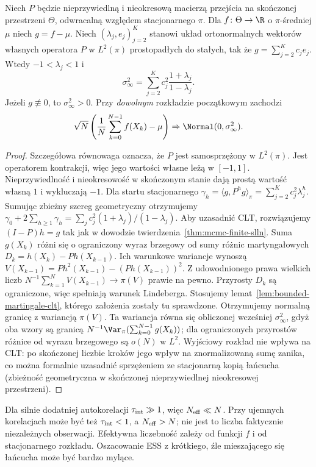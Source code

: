 \begin{twierdzenie}
\label{thm:mcmc-reversible-clt}
Niech $P$ będzie nieprzywiedlną i nieokresową
macierzą przejścia na skończonej przestrzeni $\Theta$,
odwracalną względem stacjonarnego $\pi$.
Dla $f\colon\Theta\to\R$ o $\pi$-średniej $\mu$ niech
$g=f-\mu$. Niech $(\lambda_j,e_j)_{j=2}^K$
stanowi układ ortonormalnych wektorów własnych
operatora $P$ w $L^2(\pi)$ prostopadłych do stałych,
tak że $g=\sum_{j=2}^Kc_je_j$.
Wtedy $-1<\lambda_j<1$ i
\[
 \sigma_\infty^2
 =\sum_{j=2}^K c_j^2\frac{1+\lambda_j}{1-\lambda_j}.
\]
Jeżeli $g\not\equiv0$, to $\sigma_\infty^2>0$.
Przy \emph{dowolnym} rozkładzie początkowym zachodzi
\[
 \sqrt N\left(\frac1N\sum_{k=0}^{N-1}f(X_k)-\mu\right)
 \Rightarrow\Normal(0,\sigma_\infty^2).
\]
\end{twierdzenie}
\begin{proof}
Szczegółowa równowaga oznacza, że $P$ jest samosprzężony
w $L^2(\pi)$. Jest operatorem kontrakcji, więc jego
wartości własne leżą w $[-1,1]$. Nieprzywiedlność i
nieokresowość w skończonym stanie dają prostą wartość
własną $1$ i wykluczają $-1$.
Dla startu stacjonarnego
$\gamma_h=\langle g,P^hg\rangle_\pi=
\sum_{j=2}^Kc_j^2\lambda_j^h$.
Sumując zbieżny szereg geometryczny otrzymujemy
$\gamma_0+2\sum_{h\ge1}\gamma_h
=\sum_jc_j^2(1+\lambda_j)/(1-\lambda_j)$.
Aby uzasadnić CLT, rozwiązujemy $(I-P)h=g$ tak jak
w dowodzie twierdzenia~\ref{thm:mcmc-finite-slln}.
Suma $g(X_k)$ różni się o ograniczony wyraz brzegowy
od sumy różnic martyngałowych
$D_k=h(X_k)-Ph(X_{k-1})$. Ich warunkowe wariancje
wynoszą $V(X_{k-1})=Ph^2(X_{k-1})-(Ph(X_{k-1}))^2$.
Z udowodnionego prawa wielkich liczb
$N^{-1}\sum_{k=1}^NV(X_{k-1})\to\pi(V)$
prawie na pewno. Przyrosty $D_k$ są ograniczone,
więc spełniają warunek Lindeberga. Stosujemy lemat~\ref{lem:bounded-martingale-clt},
którego założenia zostały tu sprawdzone.
Otrzymujemy normalną granicę z wariancją $\pi(V)$. Ta wariancja
równa się obliczonej wcześniej $\sigma_\infty^2$,
gdyż oba wzory są granicą $N^{-1}\Var_\pi(
\sum_{k=0}^{N-1}g(X_k))$; dla ograniczonych przyrostów
różnice od wyrazu brzegowego są $o(N)$ w $L^2$.
Wyjściowy rozkład nie wpływa na CLT: po skończonej
liczbie kroków jego wpływ na znormalizowaną sumę
zanika, co można formalnie uzasadnić sprzężeniem
ze stacjonarną kopią łańcucha (zbieżność geometryczna
w skończonej nieprzywiedlnej nieokresowej przestrzeni).
\end{proof}

\begin{uwaga}
Dla silnie dodatniej autokorelacji $\tau_{\rm int}\gg1$,
więc $N_{\rm eff}\ll N$. Przy ujemnych korelacjach
może być też $\tau_{\rm int}<1$, a $N_{\rm eff}>N$;
nie jest to liczba faktycznie niezależnych obserwacji.
Efektywna liczebność zależy od funkcji $f$ i od
stacjonarnego rozkładu. Oszacowanie ESS z krótkiego,
źle mieszającego się łańcucha może być bardzo mylące.
\end{uwaga}

